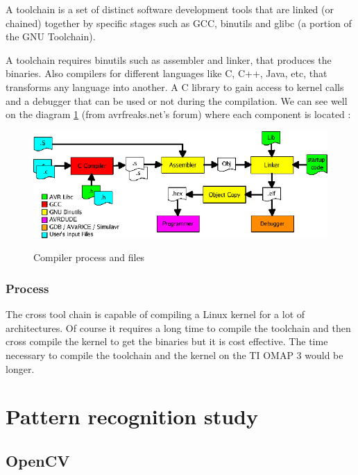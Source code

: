 	\par A toolchain is a set of distinct software development tools that are linked (or chained) together by specific stages such as GCC, binutils and glibc (a portion of the GNU Toolchain)\cite{Toolchain}.
	\par A toolchain requires binutils such as assembler and linker, that produces the binaries. Also compilers for different languages like C, C++, Java, etc, that transforms any language into another. A C library to gain access to kernel calls and a debugger that can be used or not during the compilation. We can see well on the diagram \ref{compchain} (from avrfreaks.net's forum)  where each component is located :
	\begin{figure}[ht]
		\begin{center}
			\includegraphics[scale=0.5]{images_not_compressed/compchain.png}
			\label{compchain}
			\caption{Compiler process and files}
		\end{center}
	\end{figure}
	
	
	\subsubsection{Process}
	\par The cross tool chain is capable of compiling a Linux kernel for a lot of architectures. Of course it requires a long time to compile the toolchain and then cross compile the kernel to get the binaries but it is cost effective. The time necessary to compile the toolchain and the kernel on the TI OMAP 3 would be longer.

		
	\section{Pattern recognition study}
	\subsection{OpenCV}
	
